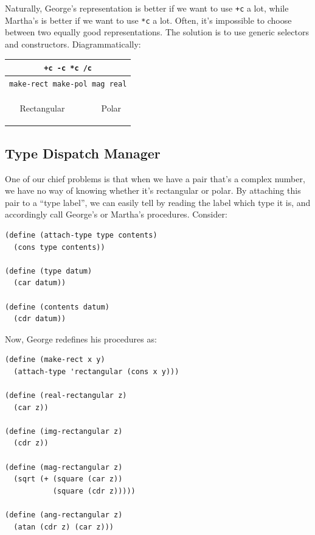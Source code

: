 \documentclass[9pt]{report}
\begin{document}
Naturally, George's representation is better if we want to use
\texttt{+c} a lot, while Martha's is better if we want to use \texttt{*c} a lot.
Often, it's impossible to choose between two equally good
representations. The solution is to use generic selectors and
constructors. Diagrammatically:

\begin{center}
\begin{tabular}[H]{|c|c|c|}
\hline
\multicolumn{3}{|c|}{\texttt{+c -c *c /c}}\\
\hline
\multicolumn{3}{|c|}{\texttt{make-rect make-pol mag real}}\\
\hline
&  &\\
&  &\\
&  &\\
Rectangular &  & Polar\\
&  &\\
&  &\\
&  &\\
\hline
\end{tabular}
\end{center}


\subsection{Type Dispatch Manager}
\label{sec:org7bc609b}

One of our chief problems is that when we have a pair that's a
complex number, we have no way of knowing whether it's rectangular
or polar. By attaching this pair to a ``type label'', we can easily
tell by reading the label which type it is, and accordingly call
George's or Martha's procedures. Consider:

\begin{verbatim}
(define (attach-type type contents)
  (cons type contents))

(define (type datum)
  (car datum))

(define (contents datum)
  (cdr datum))
\end{verbatim}

Now, George redefines his procedures as:

\begin{verbatim}
(define (make-rect x y)
  (attach-type 'rectangular (cons x y)))

(define (real-rectangular z)
  (car z))

(define (img-rectangular z)
  (cdr z))

(define (mag-rectangular z)
  (sqrt (+ (square (car z))
           (square (cdr z)))))

(define (ang-rectangular z)
  (atan (cdr z) (car z)))
\end{verbatim}
\end{document}
